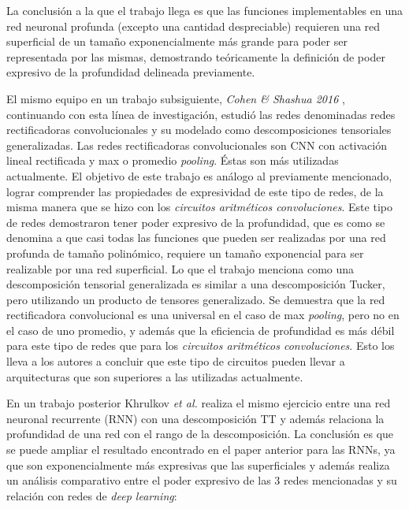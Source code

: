 \documentclass[spanish]{article}
\theoremstyle{definition}
\theoremstyle{remark}
\numberwithin{equation}{section}
\numberwithin{equation}{section} %
\begin{document}
\par 
La conclusión a la que el trabajo llega es que las funciones implementables en una red neuronal profunda (excepto una cantidad despreciable) requieren una red superficial de un tamaño exponencialmente más grande para poder ser representada por las mismas, demostrando teóricamente la definición de poder expresivo de la profundidad delineada previamente. 
\par
El mismo equipo en un trabajo subsiguiente, \textit{Cohen \& Shashua 2016} \cite{cohen2016convolutional}, continuando con esta línea de investigación, estudió las redes denominadas redes rectificadoras convolucionales y su modelado como descomposiciones tensoriales generalizadas. Las redes rectificadoras convolucionales son CNN con activación lineal rectificada y max o promedio \textit{pooling}. Éstas son más utilizadas actualmente. El objetivo de este trabajo es análogo al previamente mencionado, lograr comprender las propiedades de expresividad de este tipo de redes, de la misma manera que se hizo con los \textit{circuitos aritméticos convoluciones}. Este tipo de redes demostraron tener poder expresivo de la profundidad, que es como se denomina a que casi todas las funciones que pueden ser realizadas por una red profunda de tamaño polinómico, requiere un tamaño exponencial para ser realizable por una red superficial. Lo que el trabajo menciona como una descomposición tensorial generalizada es similar a una descomposición Tucker, pero utilizando un producto de tensores generalizado. Se demuestra que la red rectificadora convolucional es una universal en el caso de max \textit{pooling},  pero no en el caso de uno promedio, y además que la eficiencia de profundidad es más débil para este tipo de redes que para los \textit{circuitos aritméticos convoluciones}. Esto los lleva a los autores a concluir que este tipo de circuitos pueden llevar a arquitecturas que son superiores a las utilizadas actualmente.      \par
En un trabajo posterior Khrulkov \textit{et al.} \cite{khrulkov2017expressive} realiza el mismo ejercicio entre una red neuronal recurrente (RNN) con una descomposición TT \cite{oseledets2011tensor} y además relaciona la profundidad de una red con el rango de la descomposición.
\newpage 
La conclusión es que se puede ampliar el resultado encontrado en el paper anterior \cite{cohen2016expressive} para las RNNs, ya que son exponencialmente más expresivas que las superficiales y además realiza un análisis comparativo entre el poder expresivo de las 3 redes mencionadas y su relación con redes de {\it deep learning}:\par
\end{document}
